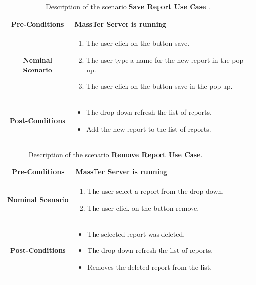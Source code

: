  \begin{table}
 	\caption{Description of the scenario \textbf{Save Report Use Case} .}
 	\label{DSTabSR}
 	\centering
 	\begin{tabular}{|c|p{10cm}|}
 		\hline 	
 	\textbf{Pre-Conditions } & MassTer Server is running\\ 
 	\hline                     
 	\textbf{Nominal Scenario } & \begin{enumerate}
 		\item The user click on the button save.
 			\item The user type a name for the new report in the pop up.
 		\item The user click on the button save in the pop up.
 	\end{enumerate} \\ 
 	\hline 
 	\textbf{Post-Conditions} & \begin{itemize}
 			\item The drop down refresh the list of reports.
 	    	\item Add the new report to the list of reports.
 	\end{itemize}\\
 	\hline  
 	\end{tabular}
 \end{table}
 
 \begin{table}
 	\caption{Description of the scenario \textbf{Remove Report Use Case}.}
 	\label{DSTabRR}
 	\centering
 	\begin{tabular}{|c|p{10cm}|}
 		\hline 	
 		\textbf{Pre-Conditions } & MassTer Server is running\\ 
 		\hline                     
 		\textbf{Nominal Scenario } & \begin{enumerate}
 			\item The user select a report from the drop down.
 			\item The user click on the button remove.
 		\end{enumerate} \\ 
 		\hline 
 		\textbf{Post-Conditions} & \begin{itemize}
 			\item The selected report was deleted.
 			\item The drop down refresh the list of reports.
 			\item Removes the deleted report from the list.
 		\end{itemize}\\
 		\hline 
 	\end{tabular}
 \end{table}
  
